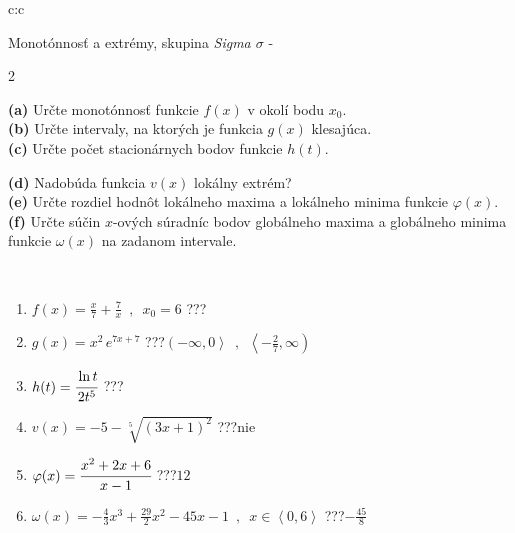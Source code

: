 \documentclass[10pt]{report}
\begin{document}
\begin{tabular}{c:c}
\begin{minipage}[c][104.5mm][t]{0.5\linewidth}
\begin{center}
\vspace{7mm}
{\huge Monotónnosť a extrémy, skupina \textit{Sigma $\sigma$} -}\\[5mm]
\begin{minipage}{0.95\linewidth}
\begin{center}
{\small \begin{multicols}{2} \raggedright
\textbf{(a)} Určte monotónnosť funkcie \(f(x)\) v okolí bodu \(x_0\). \\[1mm]
\textbf{(b)} Určte intervaly, na ktorých je funkcia \(g(x)\) klesajúca. \\[1mm]
\textbf{(c)} Určte počet stacionárnych bodov funkcie \(h(t)\). \par \columnbreak
\textbf{(d)} Nadobúda funkcia \(v(x)\) lokálny extrém? \\[1mm]
\textbf{(e)} Určte rozdiel hodnôt lokálneho maxima a lokálneho minima funkcie \(\varphi(x)\). \\[1mm]
\textbf{(f)} Určte súčin \(x\)-ových súradníc bodov globálneho maxima a globálneho minima funkcie \(\omega(x)\) na zadanom intervale. \\[1mm]
\end{multicols}
}
\end{center}
\end{minipage}
\\[4mm]
\begin{minipage}{0.79\linewidth}
\begin{center}
\begin{varwidth}{\linewidth}
\begin{enumerate}
\normalsize
\item $f(x)=\frac{x}{7}+\frac{7}{x} \enspace , \enspace x_0=6$\quad \dotfill\; ???\;\dotfill \quad {}
\item $g(x)=x^2\, e^{7x+7}$\quad \dotfill\; ???\;\dotfill \quad $\left(-\infty , 0\right\rangle\enspace , \enspace \left\langle-\frac{2}{7} , \infty\right)$
\item $h(t)=\cfrac{\ln t}{2t^5}$\quad \dotfill\; ???\;\dotfill {}
\item $v(x)=-5-\sqrt[5]{(3x+1)^2}$\quad \dotfill\; ???\;\dotfill \quad $\text{nie}$
\item $\varphi(x)=\cfrac{x^2+2x+6}{x-1}$\quad \dotfill\; ???\;\dotfill \quad $12$
\item $\omega(x)=-\frac{4}{3}x^3+\frac{29}{2}x^2-45x-1 \enspace , \enspace x\in\left\langle0 , 6\right\rangle$\quad \dotfill\; ???\;\dotfill \quad $-\frac{45}{8}$
\end{enumerate}

\end{varwidth}
\end{center}
\end{minipage}
\end{center}
\end{minipage}
\end{tabular}
\end{document}
